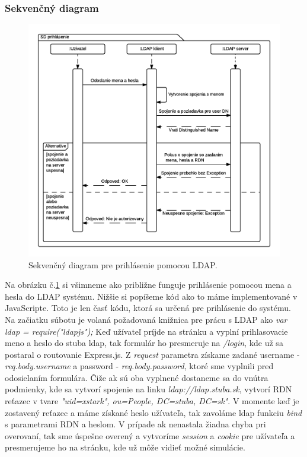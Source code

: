 \subsubsection{Sekvenčný diagram}\label{diagram-sequence-section}

\begin{figure}[H]
  \centering
  \includegraphics[scale=0.7]{img/diagrams/sequence-ldap.png}
  \caption{Sekvenčný diagram pre prihlásenie pomocou LDAP.}
  \label{img-sequence-ldap-login}
\end{figure}

Na obrázku č.\ref{img-sequence-ldap-login} si všimneme ako približne funguje prihlásenie pomocou mena a hesla do LDAP systému. Nižšie si popíšeme kód ako to máme implementované v JavaScripte. Toto je len časť kódu, ktorá sa určená pre prihlásenie do systému. Na začiatku súbotu je volaná požadovaná knižnica pre prácu s LDAP ako \textit{var ldap = require("ldapjs");}
Keď užívateľ príjde na stránku a vyplní prihlasovacie meno a heslo do stuba ldap, tak formulár ho presmeruje na \textit{/login}, kde už sa postaral o routovanie Express.js. Z \textit{request} parametra získame zadané username - \textit{req.body.username} a password - \textit{req.body.password}, ktoré sme vyplnili pred odosielaním formulára. Čiže ak sú oba vyplnené dostaneme sa do vnútra podmienky, kde sa vytvorí spojenie na linku \textit{ldap://ldap.stuba.sk}, vytvorí RDN reťazec v tvare \textit{"uid=xstark", ou=People, DC=stuba, DC=sk"}.
V momente keď je zostavený reťazec a máme získané heslo užívateľa, tak zavoláme ldap funkciu \textit{bind} s parametrami RDN a heslom. V prípade ak nenastala žiadna chyba pri overovaní, tak sme úspešne overený a vytvoríme \textit{session} a \textit{cookie} pre užívateľa a presmerujeme ho na stránku, kde už môže vidieť možné simulácie.

